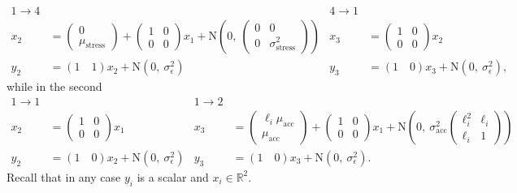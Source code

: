 \documentclass[aoas]{imsart}
\begin{document}
{\footnotesize
\begin{align*}
  1\rightarrow 4 && 4\rightarrow 1\\
  x_{2} &= \begin{pmatrix} 0\\ \mu_{\textrm{stress}} \end{pmatrix}
  + \begin{pmatrix}1&0\\0&0\end{pmatrix} x_{1} +
                           \mbox{N}\left(0,\ \begin{pmatrix}0&0\\0&\sigma_{\textrm{stress}}^2\end{pmatrix}\right)
        &   x_{3}
                    &= 
  \begin{pmatrix}1&0\\0&0\end{pmatrix} x_{2} \\
  y_2 &= (1\quad  1)  x_2 + \mbox{N}(0,\
                                 \sigma_\epsilon^2) &
y_3 &= (1\quad  0) x_3 + \mbox{N}(0,\
                                 \sigma_\epsilon^2),
\end{align*}
}%
while in the second
{\footnotesize
\begin{align*}
  1\rightarrow 1 && 1\rightarrow 2\\
  x_{2} &= 
  \begin{pmatrix}1&0\\0&0\end{pmatrix} x_{1} 
        &   x_{3}
                    &= \begin{pmatrix} \ell_i\mu_{\textrm{acc}}\\ \mu_{\textrm{acc}}\end{pmatrix} +
  \begin{pmatrix}1&0\\0&0\end{pmatrix} x_{1} +
                         \mbox{N}\left(0,\ \sigma_{\textrm{acc}}^2\begin{pmatrix} \ell_i^2 & \ell_i\\ \ell_i & 1 \end{pmatrix}\right)\\
  y_2 &= (1\quad  0)  x_2 + \mbox{N}(0,\
                                 \sigma_\epsilon^2) &
y_3 &= (1\quad  0) x_3 + \mbox{N}(0,\
                                 \sigma_\epsilon^2).
\end{align*}
}%
Recall that in any case $y_i$ is a scalar and $x_i \in \mathbb{R}^2$.
\end{document}

